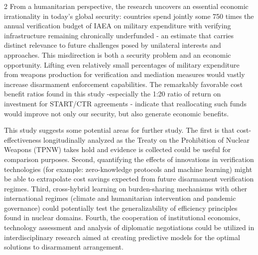 \begin{multicols}{2}
From a humanitarian perspective, the research uncovers an essential
economic irrationality in today's global security: countries spend
jointly some 750 times the annual verification budget of IAEA on
military expenditure with verifying infrastructure remaining chronically
underfunded - an estimate that carries distinct relevance to future
challenges posed by unilateral interests and approaches. This
misdirection is both a security problem and an economic opportunity.
Lifting even relatively small percentages of military expenditure from
weapons production for verification and mediation measures would vastly
increase disarmament enforcement capabilities. The remarkably favorable
cost benefit ratios found in this study -especially the 1:20 ratio of
return on investment for START/CTR agreements - indicate that
reallocating such funds would improve not only our security, but also
generate economic benefits.

This study suggests some potential areas for further study. The first is
that cost-effectiveness longitudinally analyzed as the Treaty on the
Prohibition of Nuclear Weapons (TPNW) takes hold and evidence is
collected could be useful for comparison purposes. Second, quantifying
the effects of innovations in verification technologies (for example:
zero-knowledge protocols and machine learning) might be able to
extrapolate cost savings expected from future disarmament verification
regimes. Third, cross-hybrid learning on burden-sharing mechanisms with
other international regimes (climate and humanitarian intervention and
pandemic governance) could potentially test the generalizability of
efficiency principles found in nuclear domains. Fourth, the cooperation
of institutional economics, technology assessment and analysis of
diplomatic negotiations could be utilized in interdisciplinary research
aimed at creating predictive models for the optimal solutions to
disarmament arrangement.


\end{multicols}
